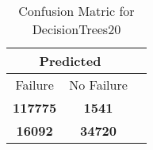 \begin{table}[] 
\caption{Confusion Matric for DecisionTrees20} 
\label{Table: Prediction Accuracy-DMDDecisionTrees20OnlySunEKF-combinationReflectionEKF-top2perfectNoFailurePrediction-Reflection} 
\centering 
\begin{tabular} 
 {@{}ccc@{}} 
\toprule 
\multicolumn{2}{c}{\textbf{Predicted}}
 \\ \midrule 
\multicolumn{1}{|c|}{Failure} & 
\multicolumn{1}{c|}{No Failure}
 \\ \midrule 
\multicolumn{1}{|c|}{\color{green}\textbf{117775}} & 
\multicolumn{1}{c|}{\color{red}\textbf{1541}}
 \\ \midrule 
\multicolumn{1}{|c|}{\color{red}\textbf{16092}} & 
\multicolumn{1}{c|}{\color{green}\textbf{34720}}
 \\ \bottomrule 
\end{tabular} 
\end{table} 
